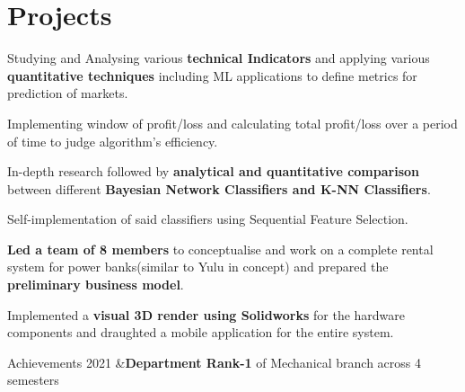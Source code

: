 \documentclass[]{deedy-resume-openfont}
\begin{document}
\begin{minipage}[t]{0.69\textwidth}
\section{Projects}
\begin{tightemize}
\item Studying and Analysing various \textbf{technical Indicators} and applying various \textbf{quantitative techniques} including ML applications to define metrics for  prediction of markets.
\item Implementing window of profit/loss and calculating total profit/loss over  a period of time to judge algorithm's efficiency.
\end{tightemize}
{}
\begin{tightemize}
\item In-depth research followed by \textbf{analytical and quantitative comparison} between different \textbf{Bayesian Network Classifiers and K-NN Classifiers}.
\item Self-implementation of said classifiers using Sequential Feature Selection.
\end{tightemize}
{}
\begin{tightemize}
\item \textbf{Led a team of 8 members} to conceptualise and work on a complete rental system for power banks(similar to Yulu in concept) and prepared the \textbf{preliminary business model}.
\item Implemented a \textbf{visual 3D render using Solidworks} for the hardware components and draughted a mobile application for the entire system.
\end{tightemize}


\begin{section}{Achievements}
2021 &\textbf{Department Rank-1 } of Mechanical branch across 4 semesters\\


\end{section}
\end{minipage}
\end{document}
